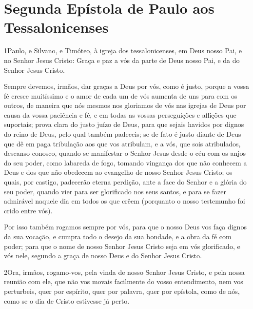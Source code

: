 \thispagestyle{empty}
\chapter*{Segunda Epístola de Paulo aos Tessalonicenses}

\lettrine{1} Paulo, e Silvano, e Timóteo, à igreja dos
tessalonicenses, em Deus nosso Pai, e no Senhor Jesus Cristo:
Graça e paz a vós da parte de Deus nosso Pai, e da do Senhor
Jesus Cristo.

Sempre devemos, irmãos, dar graças a Deus por vós, como é justo,
porque a vossa fé cresce muitíssimo e o amor de cada um de vós
aumenta de uns para com os outros, de maneira que nós mesmos nos
gloriamos de vós nas igrejas de Deus por causa da vossa paciência e
fé, e em todas as vossas perseguições e aflições que suportais;
prova clara do justo juízo de Deus, para que sejais havidos por
dignos do reino de Deus, pelo qual também padeceis; se de fato é
justo diante de Deus que dê em paga tribulação aos que vos
atribulam, e a vós, que sois atribulados, descanso conosco,
quando se manifestar o Senhor Jesus desde o céu com os anjos do seu
poder, como labareda de fogo, tomando vingança dos que não
conhecem a Deus e dos que não obedecem ao evangelho de nosso Senhor
Jesus Cristo; os quais, por castigo, padecerão eterna perdição,
ante a face do Senhor e a glória do seu poder, quando vier
para ser glorificado nos seus santos, e para se fazer admirável
naquele dia em todos os que crêem (porquanto o nosso testemunho foi
crido entre vós).

Por isso também rogamos sempre por vós, para que o nosso Deus vos
faça dignos da sua vocação, e cumpra todo o desejo da sua bondade, e
a obra da fé com poder; para que o nome de nosso Senhor Jesus
Cristo seja em vós glorificado, e vós nele, segundo a graça de nosso
Deus e do Senhor Jesus Cristo.

\medskip

\lettrine{2} Ora, irmãos, rogamo-vos, pela vinda de nosso
Senhor Jesus Cristo, e pela nossa reunião com ele, que não vos
movais facilmente do vosso entendimento, nem vos perturbeis, quer
por espírito, quer por palavra, quer por epístola, como de nós, como
se o dia de Cristo estivesse já perto.

